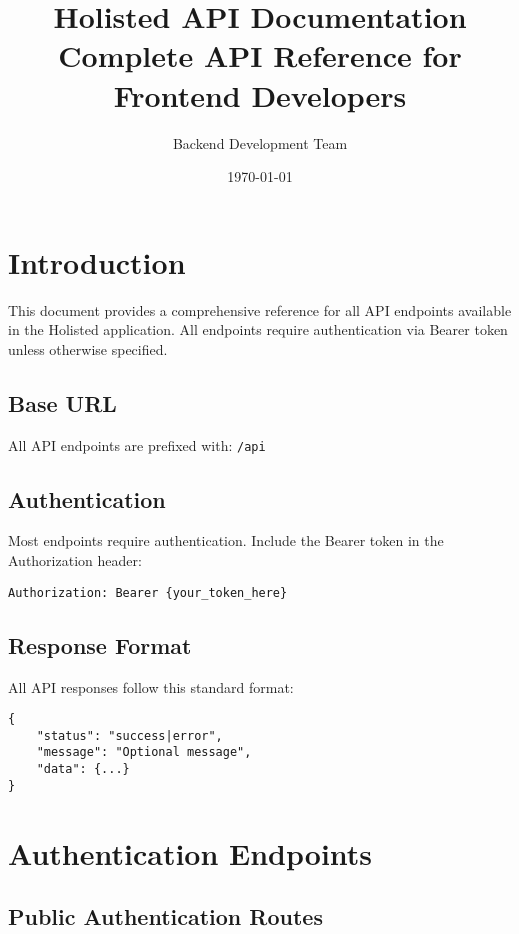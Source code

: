 \documentclass[12pt,a4paper]{article}
\begin{document}
\title{\Huge\textbf{Holisted API Documentation}\\[0.5cm]\large Complete API Reference for Frontend Developers}
\author{Backend Development Team}
\date{\today}

\maketitle

\tableofcontents
\newpage

\section{Introduction}

This document provides a comprehensive reference for all API endpoints available in the Holisted application. All endpoints require authentication via Bearer token unless otherwise specified.

\subsection{Base URL}
All API endpoints are prefixed with: \texttt{/api}

\subsection{Authentication}
Most endpoints require authentication. Include the Bearer token in the Authorization header:
\begin{lstlisting}
Authorization: Bearer {your_token_here}
\end{lstlisting}

\subsection{Response Format}
All API responses follow this standard format:
\begin{lstlisting}
{
    "status": "success|error",
    "message": "Optional message",
    "data": {...}
}
\end{lstlisting}

\section{Authentication Endpoints}

\subsection{Public Authentication Routes}
\end{document}
